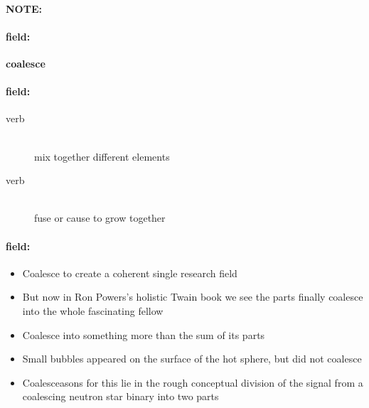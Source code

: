 \documentclass[12pt]{article}
\newenvironment{note}{\paragraph{NOTE:}}{}
\newenvironment{field}{\paragraph{field:}}{}
\begin{document}
\begin{note}
\begin{field}
\textbf{\large coalesce}
\end{field}


\begin{field}
\begin{description}
\item[verb] \hfill \\ 
mix together different elements

\item[verb] \hfill \\ 
fuse or cause to grow together

\end{description}
\end{field}

\begin{field}
\begin{itemize}
\item Coalesce to create a coherent single research field
\item But now in Ron Powers's holistic Twain book we see the parts finally coalesce into the whole fascinating fellow
\item Coalesce into something more than the sum of its parts
\item Small bubbles appeared on the surface of the hot sphere, but did not coalesce
\item Coalesceasons for this lie in the rough conceptual division of the signal from a coalescing neutron star binary into two parts
\end{itemize}
\end{field}
\end{note}
\end{document}
